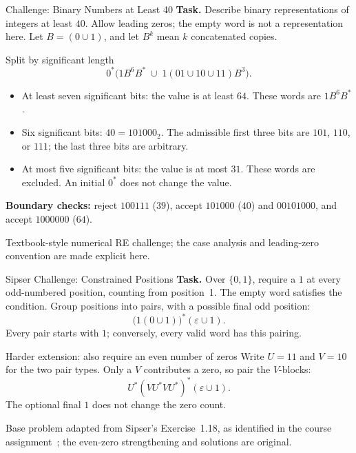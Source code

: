 \documentclass[10pt]{beamer}
\begin{document}
\begin{frame}{Challenge: Binary Numbers at Least 40}
  \small
  \textbf{Task.} Describe binary representations of integers at least $40$.
  Allow leading zeros; the empty word is not a representation here.
  Let $B=(0\cup1)$, and let $B^k$ mean $k$ concatenated copies.
  \pause
  \begin{exampleblock}{Split by significant length}
    \[
      0^*\bigl(1B^6B^*\;\cup\;1(01\cup10\cup11)B^3\bigr).
    \]
  \end{exampleblock}
  \begin{itemize}
    \item At least seven significant bits: the value is at least $64$.
      These words are $1B^6B^*$.
    \pause
    \item Six significant bits: $40=101000_2$. The admissible first three
      bits are $101$, $110$, or $111$; the last three bits are arbitrary.
    \pause
    \item At most five significant bits: the value is at most $31$.
      These words are excluded. An initial $0^*$ does not change the value.
  \end{itemize}
  \textbf{Boundary checks:} reject $100111$ ($39$), accept $101000$ ($40$)
  and $00101000$, and accept $1000000$ ($64$).
  \par\smallskip
  {\scriptsize Textbook-style numerical RE challenge; the case analysis
  and leading-zero convention are made explicit here.}
\end{frame}

\begin{frame}{Sipser Challenge: Constrained Positions}
  \small
  \textbf{Task.} Over $\{0,1\}$, require a $1$ at every odd-numbered
  position, counting from position~1. The empty word satisfies the condition.
  \pause
  Group positions into pairs, with a possible final odd position:
  \[
    \bigl(1(0\cup1)\bigr)^*(\varepsilon\cup1).
  \]
  Every pair starts with $1$; conversely, every valid word has this pairing.
  \pause
  \begin{block}{Harder extension: also require an even number of zeros}
    Write $U=11$ and $V=10$ for the two pair types. Only a $V$ contributes
    a zero, so pair the $V$-blocks:
    \[
      U^*(VU^*VU^*)^*(\varepsilon\cup1).
    \]
    The optional final $1$ does not change the zero count.
  \end{block}
  {\scriptsize Base problem adapted from Sipser's Exercise~1.18,
  as identified in the course assignment~\cite{sheard}; the even-zero
  strengthening and solutions are original.}
\end{frame}
\end{document}

